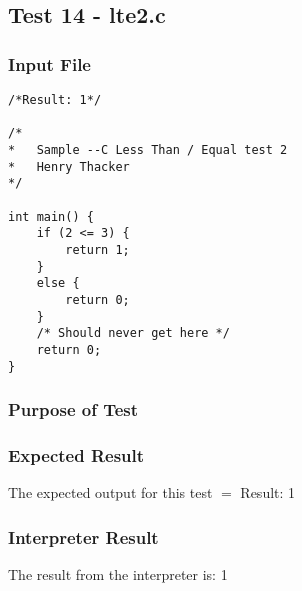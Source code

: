 \subsection{Test 14 - lte2.c}
\subsubsection{Input File}
\begin{lstlisting}[showstringspaces=false,breaklines=true,backgroundcolor=\color{light-gray}, captionpos=b]
/*Result: 1*/

/*
*	Sample --C Less Than / Equal test 2
*	Henry Thacker
*/

int main() {
	if (2 <= 3) {
		return 1;
	}
	else {
		return 0;
	}
	/* Should never get here */
	return 0;
}
\end{lstlisting}\subsubsection{Purpose of Test}

\subsubsection{Expected Result}
The expected output for this test $=$ Result: 1
\subsubsection{Interpreter Result}
The result from the interpreter is: 1
